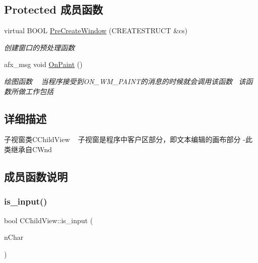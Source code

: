 \subsection*{Protected 成员函数}
\begin{DoxyCompactItemize}
\item 
\mbox{\label{class_c_child_view_a07e87a6c3606422ff10d45a47d702c7e}} 
virtual B\+O\+OL \hyperlink{class_c_child_view_a07e87a6c3606422ff10d45a47d702c7e}{Pre\+Create\+Window} (C\+R\+E\+A\+T\+E\+S\+T\+R\+U\+CT \&cs)
\begin{DoxyCompactList}\small\item\em 创建窗口的预处理函数 \end{DoxyCompactList}\item 
afx\+\_\+msg void \hyperlink{class_c_child_view_a8ea6d42631a4f9f446923ff864b239ab}{On\+Paint} ()
\begin{DoxyCompactList}\small\item\em 绘图函数 ~\newline
当程序接受到\+O\+N\+\_\+\+W\+M\+\_\+\+P\+A\+I\+N\+T的消息的时候就会调用该函数~\newline
该函数所做工作包括~\newline
\end{DoxyCompactList}\end{DoxyCompactItemize}


\subsection{详细描述}
子视窗类\+C\+Child\+View ~\newline
子视窗是程序中客户区部分，即文本编辑的画布部分 -\/此类继承自\+C\+Wnd 

\subsection{成员函数说明}
\mbox{\label{class_c_child_view_a32656902f423e5c809ca20f3013fc107}} 
\subsubsection{\texorpdfstring{is\+\_\+input()}{is\_input()}}
{\footnotesize\ttfamily bool C\+Child\+View\+::is\+\_\+input (\begin{DoxyParamCaption}\item[{U\+I\+NT}]{n\+Char }\end{DoxyParamCaption})\hspace{0.3cm}{\ttfamily [inline]}}



